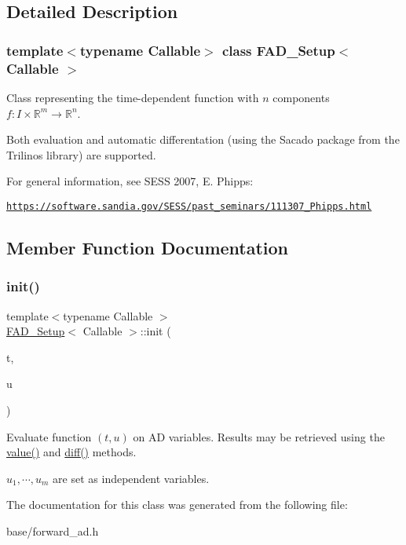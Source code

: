 \subsection{Detailed Description}
\subsubsection*{template$<$typename Callable$>$\newline
class F\+A\+D\+\_\+\+Setup$<$ Callable $>$}

Class representing the time-\/dependent function with $n$ components $f:I\times\mathbb{R}^m \rightarrow \mathbb{R}^n$. 

Both evaluation and automatic differentation (using the Sacado package from the Trilinos library) are supported.

For general information, see S\+E\+SS 2007, E. Phipps\+:

\href{https://software.sandia.gov/SESS/past_seminars/111307_Phipps.html}{\tt https\+://software.\+sandia.\+gov/\+S\+E\+S\+S/past\+\_\+seminars/111307\+\_\+\+Phipps.\+html} 

\subsection{Member Function Documentation}
\mbox{\label{classFAD__Setup_ac373589f0ea65f0d7f53e9770926e836}} 
\subsubsection{\texorpdfstring{init()}{init()}}
{\footnotesize\ttfamily template$<$typename Callable $>$ \\
\hyperlink{classFAD__Setup}{F\+A\+D\+\_\+\+Setup}$<$ Callable $>$\+::init (\begin{DoxyParamCaption}\item[{F\+P\+\_\+\+Type}]{t,  }\item[{const Vector\+D2 \&}]{u }\end{DoxyParamCaption})\hspace{0.3cm}{\ttfamily [inline]}}



Evaluate function $(t, u)$ on AD variables. Results may be retrieved using the {\ttfamily \hyperlink{classFAD__Setup_a0aab26eb92ab9fc32e6dd642b2d70a5e}{value()}} and {\ttfamily \hyperlink{classFAD__Setup_ae8e45825152e0ea2465e1ff17cab7d34}{diff()}} methods. 

$u_1,\cdots,u_m$ are set as independent variables. 

The documentation for this class was generated from the following file\+:\begin{DoxyCompactItemize}
\item 
base/forward\+\_\+ad.\+h\end{DoxyCompactItemize}
